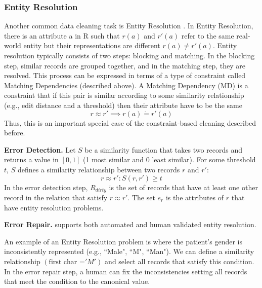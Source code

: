 \subsubsection{Entity Resolution}
Another common data cleaning task is Entity Resolution \cite{gokhale2014corleone, DBLP:journals/pvldb/KopckeTR10}.
In Entity Resolution, there is an attribute a in R such that $r(a)$ and $r'(a)$ refer to the same real-world entity but their representations are different $r(a) \ne r'(a)$.
Entity resolution typically consists of two steps: blocking and matching.
In the blocking step, similar records are grouped together, and in the matching step, they are resolved.
This process can be expressed in terms of a type of constraint called Matching Dependencies (described above).
A Matching Dependency (MD) is a constraint that if this pair is similar according to some similarity relationship (e.g., edit distance and a threshold) then their attribute have to be the same
\[ r \approx r' \implies r(a) \dot{=} r'(a) \]
Thus, this is an important special case of the constraint-based cleaning described before.

\vspace{0.5em}

\noindent\textbf{Error Detection. } Let $S$ be a similarity function that takes two records and returns a value in $[0,1]$ (1 most similar and 0 least similar). For some threshold $t$, $S$ defines a similarity relationship between two records $r$ and $r'$:
\[
r \approx r' : S(r,r') \ge t
\] 
In the error detection step, $R_{dirty}$ is the set of records that have at least one other record in the relation that satisfy $r \approx r'$.
The set $e_r$ is the attributes of $r$ that have entity resolution problems.

\vspace{0.5em}

\noindent\textbf{Error Repair. } \sys supports both automated and human validated entity resolution.

\begin{example}
An example of an Entity Resolution problem is where the patient's gender is inconsistently represented (e.g., ``Male", ``M", ``Man"). 
We can define a similarity relationship $(\text{first char =} 'M')$ and select all records that satisfy this condition.
In the error repair step, a human can fix the inconsistencies setting all records that meet the condition to the canonical value.
\end{example}

\iffalse

